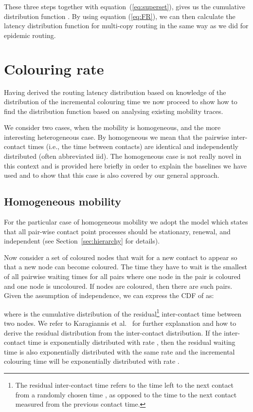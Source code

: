 \documentclass{article}
\begin{document}
These three steps together with equation~(\ref{eq:superset}), gives us
the cumulative distribution function . By using
equation (\ref{eq:FR}), we can then calculate the latency distribution
function for multi-copy routing in the same way as we did for epidemic
routing.

\section{Colouring rate}
\label{sec:colouring}

Having derived the routing latency distribution based on knowledge of
the distribution of the incremental colouring time  we now
proceed to show how to find the distribution function 
based on analysing existing mobility traces.

We consider two cases, when the mobility is homogeneous, and the more
interesting heterogeneous case. By homogeneous we mean that the
pairwise inter-contact times (i.e., the time between contacts) are
identical and independently distributed (often abbreviated iid). The
homogeneous case is not really novel in this context and is provided
here briefly in order to explain the baselines we have used and to
show that this case is also covered by our general approach.

\subsection{Homogeneous mobility}
\label{sec:homogeneous}
 
For the particular case of homogeneous mobility we adopt the model
 which states that all pair-wise
contact point processes should be stationary, renewal, and independent
(see Section~\ref{sec:hierarchy} for details).

Now consider a set of coloured nodes that wait for a new contact to
appear so that a new node can become coloured. The time they have to
wait is the smallest of all pairwise waiting times for all pairs where
one node in the pair is coloured and one node is uncoloured. If 
nodes are coloured, then there are  such pairs. Given the 
assumption of independence, we can express the CDF of  as:

where  is the cumulative distribution of the
residual\footnote{The residual inter-contact time refers to the time
  left to the next contact from a randomly chosen time , as opposed
  to the time to the next contact measured from the previous contact
  time.} inter-contact time between two nodes. We refer to Karagiannis
et al.~\cite{karagiannis10} for further explanation and how to derive
the residual distribution from the inter-contact distribution. If the
inter-contact time is exponentially distributed with rate ,
then the residual waiting time is also exponentially distributed with
the same rate and the incremental colouring time  will be
exponentially distributed with rate .
\end{document}
